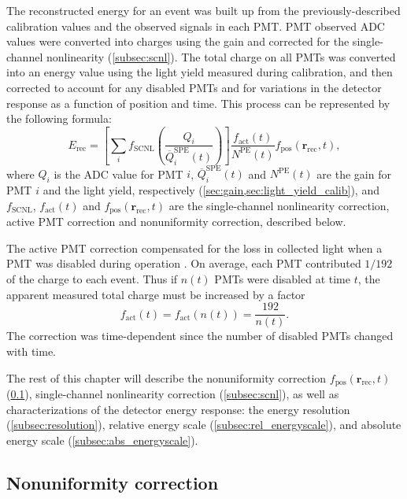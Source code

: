 The reconstructed energy for an event was built up from the previously-described
calibration values and the observed signals in each PMT.
PMT observed ADC values were converted into charges using the gain
and corrected for the single-channel nonlinearity (\cref{subsec:scnl}).
The total charge on all PMTs was converted into an energy value
using the light yield measured during calibration,
and then corrected to account for any disabled PMTs
and for variations in the detector response as a function of position and time.
This process can be represented by the following formula:
\begin{equation}
    E_{\text{rec}} = \left[
        \sum_i f_{\text{SCNL}}\left(\frac{Q_i}{\overline{Q}_i^{\text{SPE}}(t)}\right)
    \right]
    \frac{f_{\text{act}}(t)}{N^{\text{PE}}(t)}
    f_{\text{pos}}(\textbf{r}_{\text{rec}},t),
\end{equation}
where $Q_i$ is the ADC value for PMT $i$,
$\overline{Q}_i^{\text{SPE}}(t)$ and $N^{\text{PE}}(t)$
are the gain for PMT $i$ and the light yield, respectively
(\cref{sec:gain,sec:light_yield_calib}), and
$f_{\text{SCNL}}$, $f_{\text{act}}(t)$ and $f_{\text{pos}}(\textbf{r}_{\text{rec}},t)$
are the single-channel nonlinearity correction,
active PMT correction and nonuniformity correction,
described below.

The active PMT correction compensated for the loss in collected light
when a PMT was disabled during operation \cite{ngd2016}.
On average, each PMT contributed $1/192$ of the charge to each event.
Thus if $n(t)$ PMTs were disabled at time $t$, the apparent measured total charge must be increased by a factor
\begin{equation}
    f_{\text{act}}(t) = f_{\text{act}}(n(t)) = \frac{192}{n(t)}.
\end{equation}
The correction was time-dependent since the number of disabled PMTs changed with time.

The rest of this chapter will describe the
nonuniformity correction $f_{\text{pos}}(\textbf{r}_{\text{rec}},t)$
(\cref{subsec:nonuniformity}),
single-channel nonlinearity correction (\cref{subsec:scnl}),
as well as characterizations of the detector energy response:
the energy resolution (\cref{subsec:resolution}),
relative energy scale (\cref{subsec:rel_energyscale}),
and absolute energy scale (\cref{subsec:abs_energyscale}).

\subsection{Nonuniformity correction}
\label{subsec:nonuniformity}


